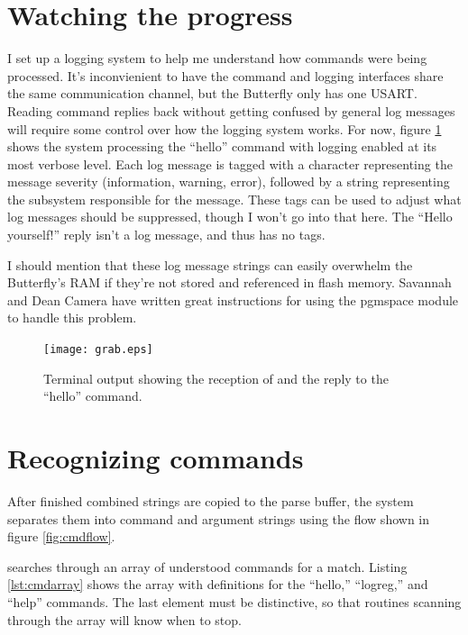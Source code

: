 \clearpage{}
\section{Watching the progress}
I set up a logging system to help me understand how commands were being processed.  It's inconvienient to have the command and logging interfaces share the same communication channel, but the Butterfly only has one USART.  Reading command replies back without getting confused by general log messages will require some control over how the logging system works.  For now, figure \ref{fig:termgrab} shows the system processing the ``hello'' command with logging enabled at its most verbose level.  Each log message is tagged with a character representing the message severity (information, warning, error), followed by a string representing the subsystem responsible for the message.  These tags can be used to adjust what log messages should be suppressed, though I won't go into that here.  The ``Hello yourself!'' reply isn't a log message, and thus has no tags.

I should mention that these log message strings can easily overwhelm the Butterfly's RAM if they're not stored and referenced in flash memory.  Savannah\cite{url:savannah:pgmspace} and Dean Camera\cite{url:deancamera:pgmspace} have written great instructions for using the pgmspace module to handle this problem.

\begin{figure}[ht]
    \begin{center}
        \texttt{[image: grab.eps]}
        \caption{Terminal output showing the reception of and the reply to the ``hello'' command.\label{fig:termgrab}}
    \end{center}
\end{figure}




\clearpage{}
\section{Recognizing commands}
After finished combined strings are copied to the parse buffer, the system separates them into command and argument strings using the flow shown in figure \ref{fig:cmdflow}.


 searches through an array of understood commands for a match.  Listing \ref{lst:cmdarray} shows the array with definitions for the ``hello,'' ``logreg,'' and ``help'' commands.    The last element must be distinctive, so that routines scanning through the array will know when to stop.
 

